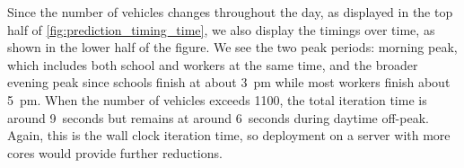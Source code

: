 Since the number of vehicles changes throughout the day, as displayed in the top half of \cref{fig:prediction_timing_time}, we also display the timings over time, as shown in the lower half of the figure. We see the two peak periods: morning peak, which includes both school and workers at the same time, and the broader evening peak since schools finish at about 3~pm while most workers finish about 5~pm. When the number of vehicles exceeds 1100, the total iteration time is around 9~seconds but remains at around 6~seconds during daytime off-peak. Again, this is the wall clock iteration time, so deployment on a server with more cores would provide further reductions.
